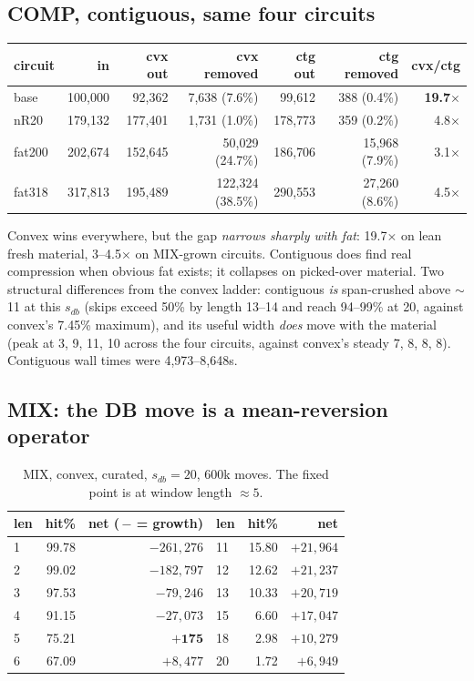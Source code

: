 \documentclass[11pt]{article}
\begin{document}
\subsection{COMP, contiguous, same four circuits}

\begin{table}[h]\centering\small
\begin{tabular}{lrrrrrr}
\toprule
circuit & in & cvx out & cvx removed & ctg out & ctg removed & cvx/ctg \\
\midrule
base & 100{,}000 & 92{,}362 & 7{,}638 (7.6\%) & 99{,}612 & 388 (0.4\%) & \textbf{19.7$\times$} \\
nR20 & 179{,}132 & 177{,}401 & 1{,}731 (1.0\%) & 178{,}773 & 359 (0.2\%) & 4.8$\times$ \\
fat200 & 202{,}674 & 152{,}645 & 50{,}029 (24.7\%) & 186{,}706 & 15{,}968 (7.9\%) & 3.1$\times$ \\
fat318 & 317{,}813 & 195{,}489 & 122{,}324 (38.5\%) & 290{,}553 & 27{,}260 (8.6\%) & 4.5$\times$ \\
\bottomrule
\end{tabular}
\end{table}

Convex wins everywhere, but the gap \emph{narrows sharply with fat}: 19.7$\times$
on lean fresh material, 3--4.5$\times$ on MIX-grown circuits. Contiguous does
find real compression when obvious fat exists; it collapses on picked-over
material. Two structural differences from the convex ladder: contiguous
\emph{is} span-crushed above $\sim$11 at this $s_{db}$ (skips exceed 50\% by
length 13--14 and reach 94--99\% at 20, against convex's 7.45\% maximum), and
its useful width \emph{does} move with the material (peak at 3, 9, 11, 10
across the four circuits, against convex's steady 7, 8, 8, 8). Contiguous
wall times were 4{,}973--8{,}648s.

\subsection{MIX: the DB move is a mean-reversion operator}

\begin{table}[h]\centering\small
\begin{tabular}{lrr|lrr}
\toprule
len & hit\% & net (\,$-$ = growth) & len & hit\% & net \\
\midrule
1 & 99.78 & $-261{,}276$ & 11 & 15.80 & $+21{,}964$ \\
2 & 99.02 & $-182{,}797$ & 12 & 12.62 & $+21{,}237$ \\
3 & 97.53 & $-79{,}246$ & 13 & 10.33 & $+20{,}719$ \\
4 & 91.15 & $-27{,}073$ & 15 & 6.60 & $+17{,}047$ \\
5 & 75.21 & $\mathbf{+175}$ & 18 & 2.98 & $+10{,}279$ \\
6 & 67.09 & $+8{,}477$ & 20 & 1.72 & $+6{,}949$ \\
\bottomrule
\end{tabular}
\caption{MIX, convex, curated, $s_{db}=20$, 600k moves. The fixed point is at
window length $\approx5$.}
\end{table}
\end{document}
